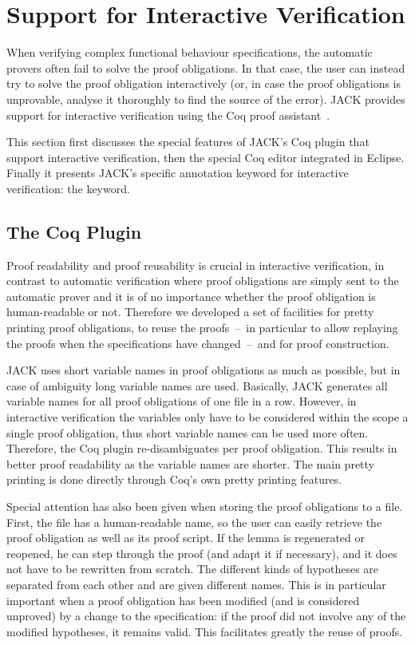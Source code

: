 

\section{Support for Interactive Verification}\label{SecInteractive}
When verifying complex functional behaviour specifications, the
automatic provers often fail to solve the proof obligations. In that
case, the user can instead try to solve the proof obligation
interactively (or, in case the proof obligations is unprovable,
analyse it thoroughly to find the source of the error). JACK provides
support for interactive verification using the Coq proof
assistant~\cite{Coq04}.

This section first discusses the special features of JACK's Coq plugin
that support interactive verification, then the special Coq editor
integrated in Eclipse. Finally it presents JACK's specific annotation
keyword for interactive verification: the \native keyword.

\subsection{The Coq Plugin}

Proof readability and proof reusability is crucial in interactive
verification, in contrast to automatic verification where proof
obligations are simply sent to the automatic prover and it is of no
importance whether the proof obligation is human-readable or not.
Therefore we developed a set of facilities for pretty printing proof
obligations, to reuse the proofs~--~in particular to allow replaying
the proofs when the specifications have changed~--~and for proof
construction.

JACK uses short variable names in proof obligations as much as
possible, but in case of ambiguity long variable names are used.
Basically, JACK generates all variable names for all proof obligations
of one file in a row. However, in interactive verification the
variables only have to be considered within the scope a single proof
obligation, thus short variable names can be used more often.
Therefore, the Coq plugin re-disambiguates per proof obligation.  This
results in better proof readability as the variable names are shorter.
The main pretty printing is done directly through Coq's own pretty
printing features.


Special attention has also been given when storing the proof
obligations to a file. First, the file has a human-readable name, so
the user can easily retrieve the proof obligation as well as its proof
script. If the lemma is regenerated or reopened, he can step through
the proof (and adapt it if necessary), and it does not have to be
rewritten from scratch.  The different kinds of hypotheses are
separated from each other and are given different names.  This is in
particular important when a proof obligation has been modified (and is
considered unproved) by a change to the specification: if the proof
did not involve any of the modified hypotheses, it remains valid. This
facilitates greatly the reuse of proofs.

